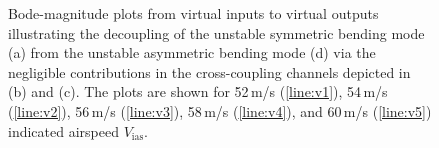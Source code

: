 \documentclass[aerospace,article,submit,moreauthors,pdftex,10pt,a4paper]{Definitions/mdpi}
\begin{document}

\begin{figure}[h]
	\centering
	
	\caption{Bode-magnitude plots from virtual inputs to virtual outputs illustrating the decoupling of the unstable symmetric bending mode (a) from the unstable asymmetric bending mode (d) via the negligible contributions in the cross-coupling channels depicted in (b) and (c). The plots are shown for 52\,m/s (\ref{line:v1}), 54\,m/s (\ref{line:v2}), 56\,m/s (\ref{line:v3}), 58\,m/s (\ref{line:v4}), and 60\,m/s (\ref{line:v5}) indicated airspeed $V_{\text{ias}}$.}
\label{fig:bode}
\end{figure}
\end{document}
